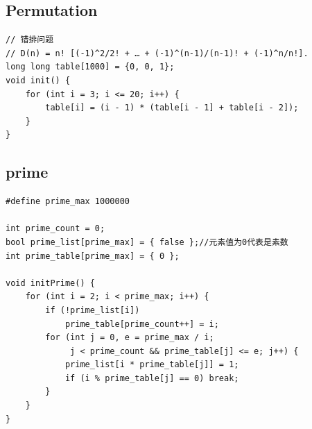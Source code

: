 \documentclass[twoside]{article}
\begin{document}
\subsection{Permutation}
\begin{lstlisting}
// 错排问题
// D(n) = n! [(-1)^2/2! + … + (-1)^(n-1)/(n-1)! + (-1)^n/n!].
long long table[1000] = {0, 0, 1};
void init() {
    for (int i = 3; i <= 20; i++) {
        table[i] = (i - 1) * (table[i - 1] + table[i - 2]);
    }
}\end{lstlisting}
\subsection{prime}
\begin{lstlisting}
#define prime_max 1000000

int prime_count = 0;
bool prime_list[prime_max] = { false };//元素值为0代表是素数
int prime_table[prime_max] = { 0 };

void initPrime() {
    for (int i = 2; i < prime_max; i++) {
        if (!prime_list[i])
            prime_table[prime_count++] = i;
        for (int j = 0, e = prime_max / i;
             j < prime_count && prime_table[j] <= e; j++) {
            prime_list[i * prime_table[j]] = 1;
            if (i % prime_table[j] == 0) break;
        }
    }
}\end{lstlisting}
\end{document}
